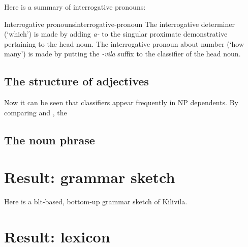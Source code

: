 \documentclass{article}
\newcommand*{\corpus}[1]{\emph{#1}}
\newcommand{\translate}[1]{`#1'}
\begin{document}
Here is a summary of interrogative pronouns:
\begin{infobox}{Interrogative pronouns}{interrogative-pronoun}
    The interrogative determiner (\translate{which}) is made by adding \corpus{a-} 
    to the singular proximate demonstrative pertaining to the head noun.
    The interrogative pronoun about number (\translate{how many}) is made by 
    putting the \corpus{-vila} suffix to the classifier of the head noun.
\end{infobox}

\subsection{The structure of adjectives}

Now it can be seen that classifiers appear frequently in NP dependents.
By comparing  and ,
the 

\subsection{The noun phrase}

\section{Result: grammar sketch}

Here is a \ac{blt}-based, bottom-up grammar sketch of Kilivila.

\section{Result: lexicon}
\end{document}
